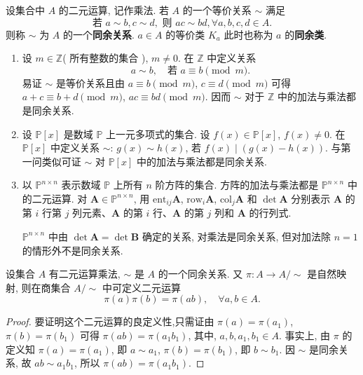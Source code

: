 \documentclass[../../main.tex]{subfiles}%
\begin{document}
\begin{definition}[同余关系和同余类]
设集合中 \( A \) 的二元运算, 记作乘法. 若 \( A \) 的一个等价关系 \( \sim \) 满足
\[
\text{若 } a \sim b, c \sim d, \text{ 则 } ac \sim bd, \forall a,b,c,d \in A .
\]
则称 \( \sim \) 为 \( A \) 的一个\textbf{同余关系}. \( a \in A \) 的等价类 \( K_a \) 此时也称为 \( a \) 的\textbf{同余类}.
\end{definition}

\begin{example}
\begin{enumerate}
\item 设 \( m \in \mathbb{Z} \)( 所有整数的集合 ), \( m \neq 0 \). 在 \( \mathbb{Z} \) 中定义关系
\[
a \sim b, \quad \text{若 } a \equiv b \pmod{m}.
\]
易证 \( \sim \) 是等价关系且由 \( a \equiv b \pmod{m} \), \( c \equiv d \pmod{m} \) 可得 \( a + c \equiv b + d \pmod{m} \), \( ac \equiv bd \pmod{m} \). 因而 \( \sim \) 对于 \( \mathbb{Z} \) 中的加法与乘法都是同余关系.

\item 设 \( \mathbb{P}[x] \) 是数域 \( \mathbb{P} \) 上一元多项式的集合. 设 \( f(x) \in \mathbb{P}[x] \), \( f(x) \neq 0 \). 在 \( \mathbb{P}[x] \) 中定义关系 \( \sim \): \( g(x) \sim h(x) \), 若 \( f(x) \mid (g(x) - h(x)) \). 与第一问类似可证 \( \sim \) 对 \( \mathbb{P}[x] \) 中的加法与乘法都是同余关系.

\item 以 \( \mathbb{P}^{n \times n} \) 表示数域 \( \mathbb{P} \) 上所有 \( n \) 阶方阵的集合. 方阵的加法与乘法都是 \( \mathbb{P}^{n \times n} \) 中的二元运算. 对 \( \boldsymbol{A} \in \mathbb{P}^{n \times n} \), 用 \( \text{ent}_{ij}\boldsymbol{A} \), \( \text{row}_i\boldsymbol{A} \), \( \text{col}_j\boldsymbol{A} \) 和 \( \det\boldsymbol{A} \) 分别表示 \( \boldsymbol{A} \) 的第 \( i \) 行第 \( j \) 列元素、\( \boldsymbol{A} \) 的第 \( i \) 行、\( \boldsymbol{A} \) 的第 \( j \) 列和 \( \boldsymbol{A} \) 的行列式.

\( \mathbb{P}^{n \times n} \) 中由 \( \det\boldsymbol{A} = \det\boldsymbol{B} \) 确定的关系, 对乘法是同余关系, 但对加法除 \( n = 1 \) 的情形外不是同余关系.
\end{enumerate}
\end{example}

\begin{theorem}\label{theorem:同余关系诱导商集中的乘法-定理1.1.3}
设集合 \( A \) 有二元运算乘法, \( \sim \) 是 \( A \) 的一个同余关系. 又 \( \pi: A \to A/\sim \) 是自然映射, 则在商集合 \( A/\sim \) 中可定义二元运算
\[
\pi(a)\pi(b) = \pi(ab),\quad \forall a,b \in A .
\]
\end{theorem}
\begin{proof}

要证明这个二元运算的良定义性,只需证由 \( \pi(a) = \pi(a_1) \), \( \pi(b) = \pi(b_1) \) 可得 \( \pi(ab) = \pi(a_1b_1) \), 其中, \( a,b,a_1, b_1 \in A \). 事实上, 由 \( \pi \) 的定义知 \( \pi(a) = \pi(a_1) \), 即 \( a \sim a_1 \), \( \pi(b) = \pi(b_1) \), 即 \( b \sim b_1 \). 因 \( \sim \) 是同余关系, 故 \( ab \sim a_1b_1 \), 所以 \( \pi(ab) = \pi(a_1b_1) \).

\end{proof}
\end{document}
